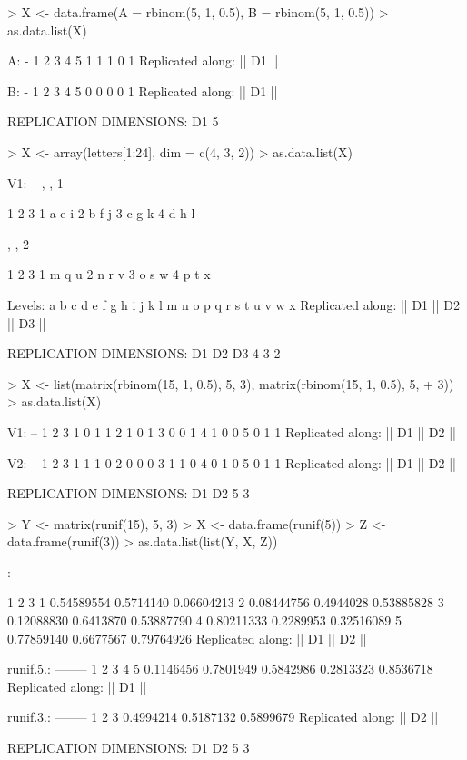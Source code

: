 \documentclass{article}
\numberwithin{exercise}{section}
\begin{document}
\begin{Schunk}
\begin{Sinput}
> X <- data.frame(A = rbinom(5, 1, 0.5), B = rbinom(5, 1, 0.5))
> as.data.list(X)
\end{Sinput}
\begin{Soutput}
A:
-
1 2 3 4 5 
1 1 1 0 1 
Replicated along:  || D1 || 


B:
-
1 2 3 4 5 
0 0 0 0 1 
Replicated along:  || D1 || 


REPLICATION DIMENSIONS: 
D1 
 5 
\end{Soutput}
\begin{Sinput}
> X <- array(letters[1:24], dim = c(4, 3, 2))
> as.data.list(X)
\end{Sinput}
\begin{Soutput}
V1:
--
, , 1

  1 2 3
1 a e i
2 b f j
3 c g k
4 d h l

, , 2

  1 2 3
1 m q u
2 n r v
3 o s w
4 p t x

Levels: a b c d e f g h i j k l m n o p q r s t u v w x
Replicated along:  || D1 || D2 || D3 || 


REPLICATION DIMENSIONS: 
D1 D2 D3 
 4  3  2 
\end{Soutput}
\begin{Sinput}
> X <- list(matrix(rbinom(15, 1, 0.5), 5, 3), matrix(rbinom(15, 1, 0.5), 5, 
+     3))
> as.data.list(X)
\end{Sinput}
\begin{Soutput}
V1:
--
  1 2 3
1 0 1 1
2 1 0 1
3 0 0 1
4 1 0 0
5 0 1 1
Replicated along:  || D1 || D2 || 


V2:
--
  1 2 3
1 1 1 0
2 0 0 0
3 1 1 0
4 0 1 0
5 0 1 1
Replicated along:  || D1 || D2 || 


REPLICATION DIMENSIONS: 
D1 D2 
 5  3 
\end{Soutput}
\begin{Sinput}
> Y <- matrix(runif(15), 5, 3)
> X <- data.frame(runif(5))
> Z <- data.frame(runif(3))
> as.data.list(list(Y, X, Z))
\end{Sinput}
\begin{Soutput}
:

           1         2          3
1 0.54589554 0.5714140 0.06604213
2 0.08444756 0.4944028 0.53885828
3 0.12088830 0.6413870 0.53887790
4 0.80211333 0.2289953 0.32516089
5 0.77859140 0.6677567 0.79764926
Replicated along:  || D1 || D2 || 


runif.5.:
--------
        1         2         3         4         5 
0.1146456 0.7801949 0.5842986 0.2813323 0.8536718 
Replicated along:  || D1 || 


runif.3.:
--------
        1         2         3 
0.4994214 0.5187132 0.5899679 
Replicated along:  || D2 || 


REPLICATION DIMENSIONS: 
D1 D2 
 5  3 
\end{Soutput}
\end{Schunk}
\end{document}
